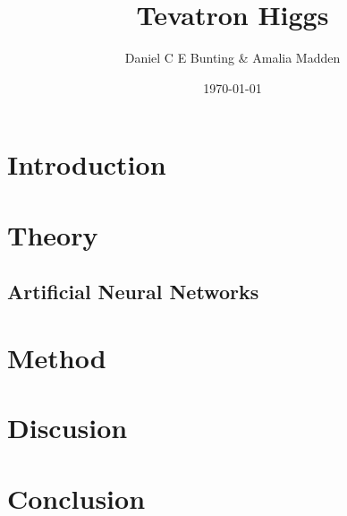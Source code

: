 \documentclass{article}
\title{Tevatron Higgs}
\author{ Daniel C E Bunting \& Amalia Madden}
\date{\today}
\begin{document}
\maketitle
\begin{abstract}
\end{abstract}

\section{Introduction} %
\label{sec:introduction}


\section{Theory} %
\label{sec:theory}

\subsection{Artificial Neural Networks} %
\label{sub:artificial_neural_networks}





\section{Method} %
\label{sec:method}


\section{Discusion} %
\label{sec:discusion}


\section{Conclusion} %
\label{sec:conclusion}




 


\clearpage
\end{document}
